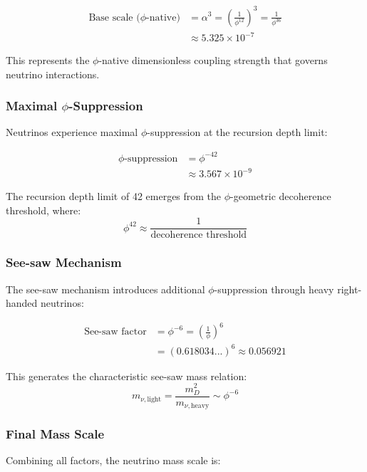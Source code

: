 \begin{align}
\text{Base scale ($\phi$-native)} &= \alpha^3 = \left(\frac{1}{\phi^{12}}\right)^3 = \frac{1}{\phi^{36}}\\
&\approx 5.325 \times 10^{-7}
\end{align}

This represents the $\phi$-native dimensionless coupling strength that governs neutrino interactions.

\subsubsection{Maximal $\phi$-Suppression}

Neutrinos experience maximal $\phi$-suppression at the recursion depth limit:

\begin{align}
\text{$\phi$-suppression} &= \phi^{-42}\\
&\approx 3.567 \times 10^{-9}
\end{align}

The recursion depth limit of 42 emerges from the $\phi$-geometric decoherence threshold, where:
\begin{equation}
\phi^{42} \approx \frac{1}{\text{decoherence threshold}}
\end{equation}

\subsubsection{See-saw Mechanism}

The see-saw mechanism introduces additional $\phi$-suppression through heavy right-handed neutrinos:

\begin{align}
\text{See-saw factor} &= \phi^{-6} = \left(\frac{1}{\phi}\right)^6\\
&= (0.618034...)^6 \approx 0.056921
\end{align}

This generates the characteristic see-saw mass relation:
\begin{equation}
m_{\nu,\text{light}} = \frac{m_D^2}{m_{\nu,\text{heavy}}} \sim \phi^{-6}
\end{equation}

\subsubsection{Final Mass Scale}

Combining all factors, the neutrino mass scale is:

